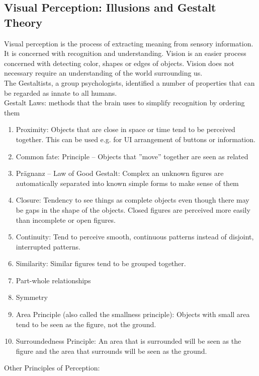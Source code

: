 \subsection{Visual Perception: Illusions and Gestalt Theory}
Visual perception is the process of extracting meaning from sensory information. It is concerned with recognition and understanding.
Vision is an easier process concerned with detecting color, shapes or edges of objects. Vision does not necessary require an understanding of the world surrounding us.\\
The Gestaltists, a group psychologists, identified a number of properties that can be regarded as innate to all humans. \\
Gestalt Laws: methods that the brain uses to simplify recognition by ordering them
\begin{enumerate}
\item Proximity: Objects that are close in space or time tend to be perceived together. This can be used e.g. for UI arrangement of buttons or information.
\item Common fate: Principle – Objects that ''move” together are seen as related
\item Prägnanz -- Law of Good Gestalt: Complex an unknown figures are automatically separated into known simple forms to make sense of them
\item Closure: Tendency to see things as complete objects even though there may be gaps in the shape of the objects. Closed figures are perceived more easily than incomplete or open figures.
\item Continuity: Tend to perceive smooth, continuous patterns instead of disjoint, interrupted patterns.
\item Similarity: Similar figures tend to be grouped together.
\item Part-whole relationships
\item Symmetry
\item Area Principle (also called the smallness principle): Objects with small area tend to be seen as the figure, not the ground.
\item Surroundedness Principle: An area that is surrounded will be seen as the figure and the area that surrounds will be seen as the ground.
\end{enumerate}
Other Principles of Perception:
